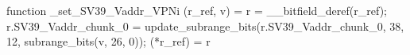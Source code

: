function _set_SV39_Vaddr_VPNi (r_ref, v) = {
    r = __bitfield_deref(r_ref);
    r.SV39_Vaddr_chunk_0 = update_subrange_bits(r.SV39_Vaddr_chunk_0, 38, 12, subrange_bits(v, 26, 0));
    (*r_ref) = r
}

